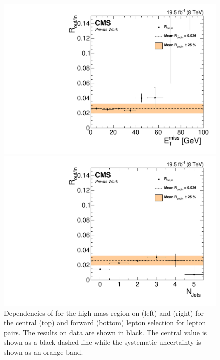 \begin{figure}[htbp]
\begin{minipage}[t]{0.49\textwidth}
  \includegraphics[width=\textwidth]{plots/BG/rOutIn/rOutInSyst_DrellYanControlForward_Full2012_MET_HighMass_MM_None.pdf}
\end{minipage}
\begin{minipage}[t]{0.49\textwidth}
\includegraphics[width=\textwidth]{plots/BG/rOutIn/rOutInSyst_DrellYanControlForward_Full2012_NJets_HighMass_MM_None.pdf}
\end{minipage}
\caption{Dependencies of \Routin for the high-mass region on \MET (left) and \njets (right) for the central (top) and forward (bottom) lepton selection for \MM lepton pairs. The results on data are shown in black. The central value is shown as a black dashed line while the systematic uncertainty is shown as an orange band.}
\label{fig:ROutInDependencies6}
\end{figure} 